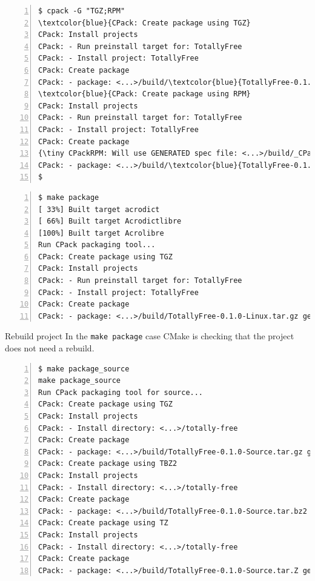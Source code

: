 \documentclass[compress,slidestop,table,usepdftitle=false
              ]
               {beamer}
\newcommand{\fname}[1]{\texttt{#1}}
\begin{document}
\begin{frame}
\begin{Verbatim}[commandchars=\\\{\},fontsize=\scriptsize,numbers=left,frame=topline,label=cpack command line example]
$ cpack -G "TGZ;RPM"
\textcolor{blue}{CPack: Create package using TGZ}
CPack: Install projects
CPack: - Run preinstall target for: TotallyFree
CPack: - Install project: TotallyFree
CPack: Create package
CPack: - package: <...>/build/\textcolor{blue}{TotallyFree-0.1.0-Linux.tar.gz} generated.
\textcolor{blue}{CPack: Create package using RPM}
CPack: Install projects
CPack: - Run preinstall target for: TotallyFree
CPack: - Install project: TotallyFree
CPack: Create package
{\tiny CPackRPM: Will use GENERATED spec file: <...>/build/_CPack_Packages/Linux/RPM/SPECS/totallyfree.spec}
CPack: - package: <...>/build/\textcolor{blue}{TotallyFree-0.1.0-Linux.rpm} generated.
$
\end{Verbatim}
\begin{Verbatim}[commandchars=\\\{\},fontsize=\scriptsize,numbers=left,frame=topline,label=make package example]
$ make package
[ 33%] Built target acrodict
[ 66%] Built target Acrodictlibre
[100%] Built target Acrolibre
Run CPack packaging tool...
CPack: Create package using TGZ
CPack: Install projects
CPack: - Run preinstall target for: TotallyFree
CPack: - Install project: TotallyFree
CPack: Create package
CPack: - package: <...>/build/TotallyFree-0.1.0-Linux.tar.gz generated.
\end{Verbatim}
\begin{alertblock}{Rebuild project}
 In the \fname{make package} case CMake is checking that the project does not need a rebuild.
\end{alertblock}

\begin{Verbatim}[commandchars=\\\{\},fontsize=\scriptsize,numbers=left,frame=topline,label=make package\_source example]
$ make package_source
make package_source 
Run CPack packaging tool for source...
CPack: Create package using TGZ
CPack: Install projects
CPack: - Install directory: <...>/totally-free
CPack: Create package
CPack: - package: <...>/build/TotallyFree-0.1.0-Source.tar.gz generated.
CPack: Create package using TBZ2
CPack: Install projects
CPack: - Install directory: <...>/totally-free
CPack: Create package
CPack: - package: <...>/build/TotallyFree-0.1.0-Source.tar.bz2 generated.
CPack: Create package using TZ
CPack: Install projects
CPack: - Install directory: <...>/totally-free
CPack: Create package
CPack: - package: <...>/build/TotallyFree-0.1.0-Source.tar.Z generated.
\end{Verbatim}
\end{frame}
\end{document}
